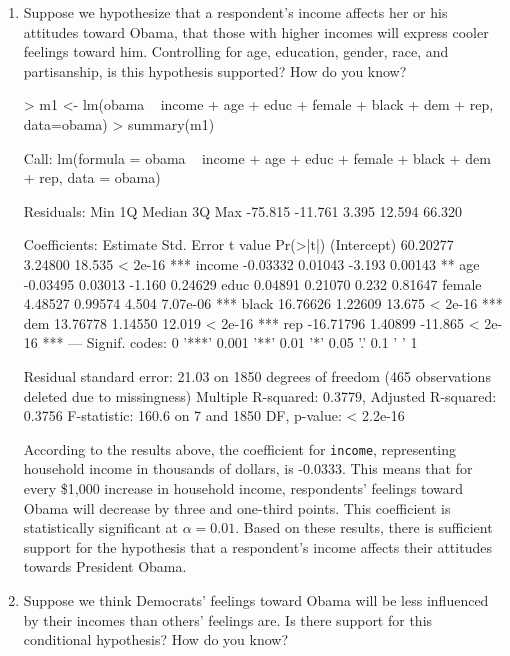 \documentclass[12pt]{article}
\begin{document}
\begin{enumerate}
\item Suppose we hypothesize that a respondent's income affects her or his attitudes toward Obama, that those with higher incomes will express cooler feelings toward him.  Controlling for age, education, gender, race, and partisanship, is this hypothesis supported?  How do you know?

\begin{Schunk}
\begin{Sinput}
> m1 <- lm(obama ~ income + age + educ + female + black + dem + rep, data=obama)
> summary(m1)
\end{Sinput}
\begin{Soutput}
Call:
lm(formula = obama ~ income + age + educ + female + black + dem + 
    rep, data = obama)

Residuals:
    Min      1Q  Median      3Q     Max 
-75.815 -11.761   3.395  12.594  66.320 

Coefficients:
             Estimate Std. Error t value Pr(>|t|)    
(Intercept)  60.20277    3.24800  18.535  < 2e-16 ***
income       -0.03332    0.01043  -3.193  0.00143 ** 
age          -0.03495    0.03013  -1.160  0.24629    
educ          0.04891    0.21070   0.232  0.81647    
female        4.48527    0.99574   4.504 7.07e-06 ***
black        16.76626    1.22609  13.675  < 2e-16 ***
dem          13.76778    1.14550  12.019  < 2e-16 ***
rep         -16.71796    1.40899 -11.865  < 2e-16 ***
---
Signif. codes:  0 '***' 0.001 '**' 0.01 '*' 0.05 '.' 0.1 ' ' 1

Residual standard error: 21.03 on 1850 degrees of freedom
  (465 observations deleted due to missingness)
Multiple R-squared:  0.3779,	Adjusted R-squared:  0.3756 
F-statistic: 160.6 on 7 and 1850 DF,  p-value: < 2.2e-16
\end{Soutput}
\end{Schunk}

According to the results above, the coefficient for \texttt{income}, representing household income in thousands of dollars, is -0.0333. This means that for every \$1,000 increase in household income, respondents' feelings toward Obama will decrease by three and one-third points. This coefficient is statistically significant at $\alpha=0.01$. Based on these results, there is sufficient support for the hypothesis that a respondent's income affects their attitudes towards President Obama.


\item Suppose we think Democrats' feelings toward Obama will be less influenced by their incomes than others' feelings are.  Is there support for this conditional hypothesis?  How do you know?\\


\end{enumerate}
\end{document}
